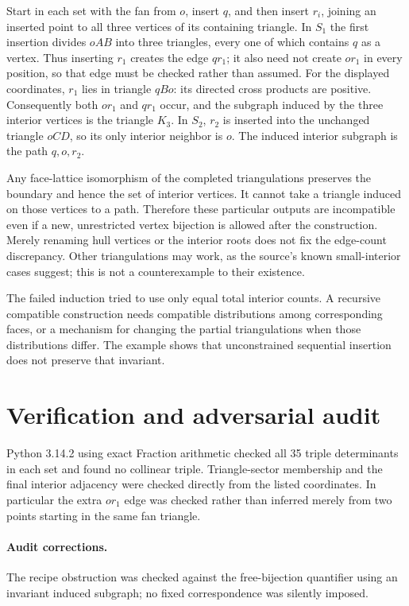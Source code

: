 \documentclass[11pt]{article}
\begin{document}
Start in each set with the fan from $o$, insert $q$, and then insert $r_i$,
joining an inserted point to all three vertices of its containing triangle.
In $S_1$ the first insertion divides $oAB$ into three triangles, every one of
which contains $q$ as a vertex. Thus inserting $r_1$ creates the edge $qr_1$;
it also need not create $or_1$ in every position, so that edge must be checked
rather than assumed. For the displayed coordinates, $r_1$ lies in triangle
$qBo$: its directed cross products are positive. Consequently both $or_1$
and $qr_1$ occur, and the subgraph induced by the three interior vertices is
the triangle $K_3$.
In $S_2$, $r_2$ is inserted into the unchanged triangle $oCD$, so its only
interior neighbor is $o$. The induced interior subgraph is the path $q,o,r_2$.

Any face-lattice isomorphism of the completed triangulations preserves the
boundary and hence the set of interior vertices. It cannot take a triangle
induced on those vertices to a path. Therefore these particular outputs are
incompatible even if a new, unrestricted vertex bijection is allowed after the
construction. Merely renaming hull vertices or the interior roots does not fix
the edge-count discrepancy. Other triangulations may work, as the source's
known small-interior cases suggest; this is not a counterexample to their existence.

The failed induction tried to use only equal total interior counts. A recursive
compatible construction needs compatible distributions among corresponding
faces, or a mechanism for changing the partial triangulations when those
distributions differ. The example shows that unconstrained sequential insertion
does not preserve that invariant.
\section{Verification and adversarial audit}
Python 3.14.2 using exact Fraction arithmetic checked all 35 triple
determinants in each set and found no collinear triple. Triangle-sector membership
and the final interior adjacency were checked directly from the listed coordinates.
In particular the extra $or_1$ edge was checked rather than inferred merely from
two points starting in the same fan triangle.
\paragraph{Audit corrections.} The recipe obstruction was checked against the free-bijection quantifier using an invariant induced subgraph; no fixed correspondence was silently imposed.
\end{document}
